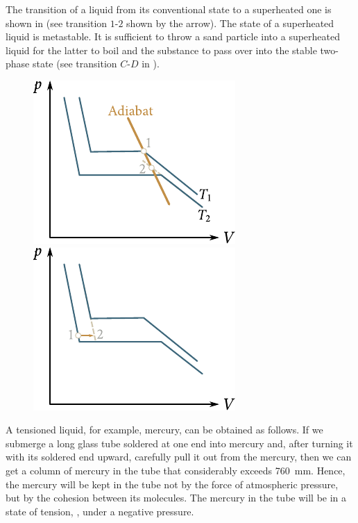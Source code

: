 The transition of a liquid from its conventional state to a superheated one is shown in  (see transition $1$-$2$ shown by the arrow). The state of a superheated liquid is metastable. It is sufficient to throw a sand particle into a superheated liquid for the latter to boil and the substance to pass over into the stable two-phase state (see transition $C$-$D$ in ).

\begin{figure}[t]
	\begin{minipage}[t]{0.5\linewidth}
		\begin{center}
			\includegraphics[scale=1]{figures/ch_15/fig_15_11.pdf}
			\caption[]{}
			\label{fig:15_11}
		\end{center}
	\end{minipage}
	\hspace{-0.05cm}
	\begin{minipage}[t]{0.5\linewidth}
		\begin{center}
			\includegraphics[scale=1]{figures/ch_15/fig_15_12.pdf}
			\caption[]{}
			\label{fig:15_12}
		\end{center}
	\end{minipage}
	\vspace{-0.4cm}
\end{figure}

A tensioned liquid, for example, mercury, can be obtained as follows. If we submerge a long glass tube soldered at one end into mercury and, after turning it with its soldered end upward, carefully pull it out from the mercury, then we can get a column of mercury in the tube that considerably exceeds \SI{760}{\milli\metre}. Hence, the mercury will be kept in the tube not by the force of atmospheric pressure, but by the cohesion between its molecules. The mercury in the tube will be in a state of tension, \ie, under a negative pressure.

